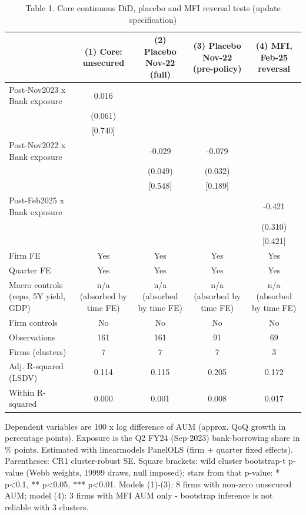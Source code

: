 \begin{table}[htbp]\centering\small
\caption{Table 1. Core continuous DiD, placebo and MFI reversal tests (update specification)}
\begin{tabular}{lcccc}
\hline\hline
 & (1) Core: unsecured & (2) Placebo Nov-22 (full) & (3) Placebo Nov-22 (pre-policy) & (4) MFI, Feb-25 reversal \\
\hline
Post-Nov2023 x Bank exposure & 0.016 &  &  &  \\
 & (0.061) &  &  &  \\
 & [0.740] &  &  &  \\
Post-Nov2022 x Bank exposure &  & -0.029 & -0.079 &  \\
 &  & (0.049) & (0.032) &  \\
 &  & [0.548] & [0.189] &  \\
Post-Feb2025 x Bank exposure &  &  &  & -0.421 \\
 &  &  &  & (0.310) \\
 &  &  &  & [0.421] \\
\hline
Firm FE & Yes & Yes & Yes & Yes \\
Quarter FE & Yes & Yes & Yes & Yes \\
Macro controls (repo, 5Y yield, GDP) & n/a (absorbed by time FE) & n/a (absorbed by time FE) & n/a (absorbed by time FE) & n/a (absorbed by time FE) \\
Firm controls & No & No & No & No \\
Observations & 161 & 161 & 91 & 69 \\
Firms (clusters) & 7 & 7 & 7 & 3 \\
Adj. R-squared (LSDV) & 0.114 & 0.115 & 0.205 & 0.172 \\
Within R-squared & 0.000 & 0.001 & 0.008 & 0.017 \\
\hline\hline
\end{tabular}
\par\footnotesize Dependent variables are 100 x log difference of AUM (approx. QoQ growth in percentage points). Exposure is the Q2 FY24 (Sep-2023) bank-borrowing share in \% points. Estimated with linearmodels PanelOLS (firm + quarter fixed effects). Parentheses: CR1 cluster-robust SE. Square brackets: wild cluster bootstrap-t p-value (Webb weights, 19999 draws, null imposed); stars from that p-value: * p<0.1, ** p<0.05, *** p<0.01. Models (1)-(3): 8 firms with non-zero unsecured AUM; model (4): 3 firms with MFI AUM only - bootstrap inference is not reliable with 3 clusters.
\end{table}